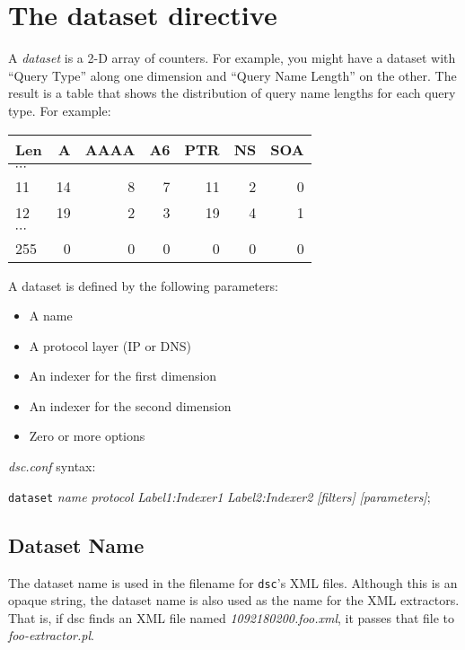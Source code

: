 \documentclass{report}
\def\dsc{{\sc dsc}}
\begin{document}
\section{The dataset directive}

A {\em dataset\/} is a 2-D array of counters.  For example, you
might have a dataset with ``Query Type'' along one dimension and
``Query Name Length'' on the other.  The result is a table that
shows the distribution of query name lengths for each query type.
For example:

\vspace{1ex}
\begin{center}
\begin{tabular}{l|rrrrrr}
Len & A & AAAA & A6 & PTR & NS & SOA \\
\hline
$\cdots$ & & & & & \\
11 & 14 & 8 & 7 & 11 & 2 & 0 \\
12 & 19 & 2 & 3 & 19 & 4 & 1 \\
$\cdots$ & & & & & & \\
255 & 0 & 0 & 0 & 0 & 0 & 0 \\
\hline
\end{tabular}
\end{center}
\vspace{1ex}

\noindent
A dataset is defined by the following parameters:
\begin{itemize}
\setlength{\itemsep}{0ex plus 0.5ex minus 0.0ex}
\item A name
\item A protocol layer (IP or DNS)
\item An indexer for the first dimension
\item An indexer for the second dimension
\item Zero or more options
\end{itemize}

\noindent
{\em dsc.conf\/} syntax:

{\tt dataset\/}
{\em name\/}
{\em protocol\/}
{\em Label1:Indexer1\/}
{\em Label2:Indexer2\/}
{\em [filters]\/} 
{\em [parameters]\/};
\vspace{2ex}

\subsection{Dataset Name}

The dataset name is used in the filename for {\tt dsc\/}'s XML
files.  Although this is an opaque string, the dataset name is also
used as the name for the XML extractors.  That is, if {\dsc} finds
an XML file named {\em 1092180200.foo.xml\/}, it passes that file
to {\em foo-extractor.pl\/}.
\end{document}
